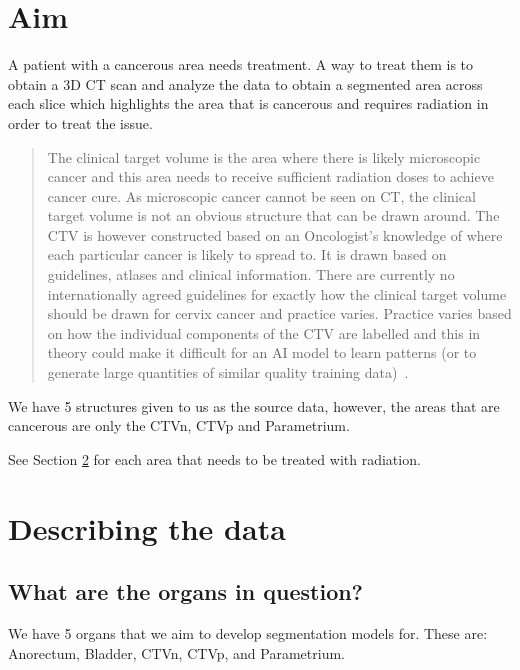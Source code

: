 \documentclass[11pt]{article}
\begin{document}


\tableofcontents

\clearpage

\section{Aim}

A patient with a cancerous area needs treatment. A way to treat them is to obtain a 3D CT scan and analyze the data to obtain a segmented area across each slice which highlights the area that is cancerous and requires radiation in order to treat the issue.

\begin{quote}
    The clinical target volume is the area where there is likely microscopic cancer and this area needs to receive sufficient radiation doses to achieve cancer cure. As microscopic cancer cannot be seen on CT, the clinical target volume is not an obvious structure that can be drawn around. The CTV is however constructed based on an Oncologist's knowledge of where each particular cancer is likely to spread to. It is drawn based on guidelines, atlases and clinical information. There are currently no internationally agreed guidelines for exactly how the clinical target volume should be drawn for cervix cancer and practice varies. Practice varies based on how the individual components of the CTV are labelled and this in theory could make it difficult for an AI model to learn patterns (or to generate large quantities of similar quality training data)~\cite{AMLART-data}.
\end{quote}

We have 5 structures given to us as the source data, however, the areas that are cancerous are only the CTVn, CTVp and Parametrium. 

See Section \ref{ref:DescribingTheData} for each area that needs to be treated with radiation.

\section{Describing the data}\label{ref:DescribingTheData}

\subsection{What are the organs in question?}

We have 5 organs that we aim to develop segmentation models for. These are: Anorectum, Bladder, CTVn, CTVp, and Parametrium.
\end{document}
